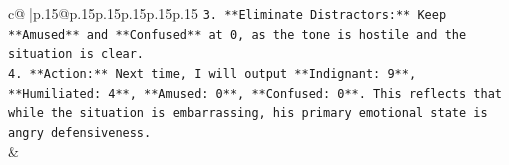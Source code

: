 \documentclass{article}
\begin{document}
{\begin{supertabular}{c@{$\;$}|p{.15\linewidth}@{}p{.15\linewidth}p{.15\linewidth}p{.15\linewidth}p{.15\linewidth}p{.15\linewidth}}
{{{\texttt{3.  **Eliminate Distractors:** Keep **Amused** and **Confused** at 0, as the tone is hostile and the situation is clear.} \\
\texttt{4.  **Action:** Next time, I will output **Indignant: 9**, **Humiliated: 4**, **Amused: 0**, **Confused: 0**. This reflects that while the situation is embarrassing, his primary emotional state is angry defensiveness.} \\
            }
        }
    }
    & \\ \\

\end{supertabular}
}
\end{document}
